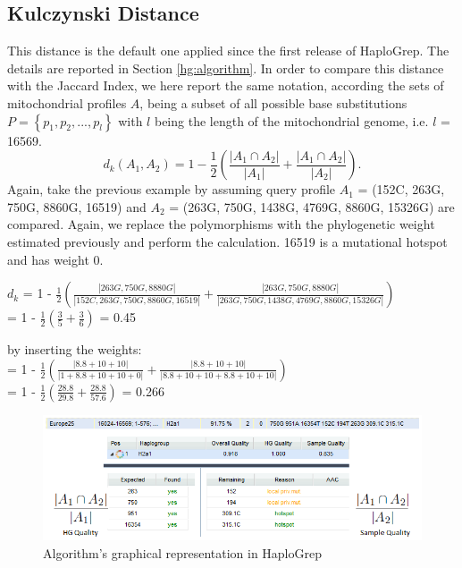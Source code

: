 \subsection{Kulczynski Distance}
This distance is the default one applied since the first release of HaploGrep. The details are reported in Section \ref{hg:algorithm}. In order to compare this distance with the Jaccard Index, we here report the same notation, according the sets of mitochondrial profiles $A$, being a subset of all possible base substitutions $P = \left\{ p_1, p_2, ..., p_l \right\} $ with $l$ being the length of the mitochondrial genome, i.e. $l$ = 16569. 
\begin{equation}
d_k (A_1, A_2) = 1 - \frac{1}{2} \left( \frac{\left|A_1  \cap A_2\right| }{\left|A_1  \right|} + \frac{\left|A_1  \cap A_2\right| }{\left|A_2 \right| } \right).
\end{equation}
Again, take the previous example by assuming query profile $A_1$ = (152C, 263G, 750G, 8860G, 16519) and $A_2$ =  (263G, 750G, 1438G, 4769G, 8860G, 15326G) are compared. Again, we replace the polymorphisms with the phylogenetic weight estimated previously and perform the calculation. 16519 is a mutational hotspot and has weight 0.

$d_k$ = 1 - $\frac{1}{2} \left(  \frac{\left| 263G, 750G, 8880G \right|}{\left| 152C, 263G, 750G, 8860G, 16519 \right|} +\frac{\left| 263G, 750G, 8880G \right|}{\left| 263G, 750G, 1438G, 4769G, 8860G, 15326G \right|} \right)$ 
\\= 1 - $\frac{1}{2} \left(  \frac{3}{5} +\frac{3}{6} \right)$ = 0.45

by inserting the weights:
\\= 1 - $\frac{1}{2} \left(  \frac{\left| 8.8 + 10 +10 \right|}{\left| 1 + 8.8 + 10 +10 +0 \right|} +\frac{\left| 8.8 + 10 + 10 \right|}{\left| 8.8 + 10 + 10 + 8.8+ 10 +10 \right|} \right)$ 
\\= 1 - $\frac{1}{2} \left(  \frac{28.8}{29.8} +\frac{28.8}{57.6} \right)$ = 0.266\\
\begin{figure}[!ht]
    \centering
    \includegraphics[width=1\textwidth]{images/HG-sample-qual.png}
    \caption[Algorithm's graphical representation in HaploGrep]{ Algorithm's graphical representation in HaploGrep} 
    \label{hg:kulczy}
\end{figure}

